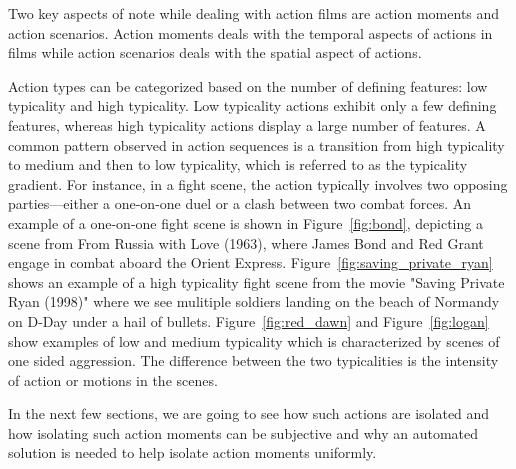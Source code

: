 \documentclass[12pt]{report}
\begin{document}
	Two key aspects of note while dealing with action films are action moments and action scenarios. Action moments deals with the temporal aspects of actions in films while action scenarios deals with the spatial aspect of actions.
	
	Action types can be categorized based on the number of defining features: low typicality and high typicality. Low typicality actions exhibit only a few defining features, whereas high typicality actions display a large number of features. A common pattern observed in action sequences is a transition from high typicality to medium and then to low typicality, which is referred to as the typicality gradient. For instance, in a fight scene, the action typically involves two opposing parties—either a one-on-one duel or a clash between two combat forces. An example of a one-on-one fight scene is shown in Figure~\ref{fig:bond}, depicting a scene from From Russia with Love (1963), where James Bond and Red Grant engage in combat aboard the Orient Express. Figure~\ref{fig:saving_private_ryan} shows an example of a high typicality fight scene from the movie "Saving Private Ryan (1998)" where we see mulitiple soldiers landing on the beach of Normandy on D-Day under a hail of bullets. Figure~\ref{fig:red_dawn} and Figure~\ref{fig:logan} show examples of low and medium typicality which is characterized by scenes of one sided aggression. The difference between the two typicalities is the intensity of action or motions in the scenes.
	
	In the next few sections, we are going to see how such actions are isolated and how isolating such action moments can be subjective and why an automated solution is needed to help isolate action moments uniformly.
	
	
	
\end{document}
